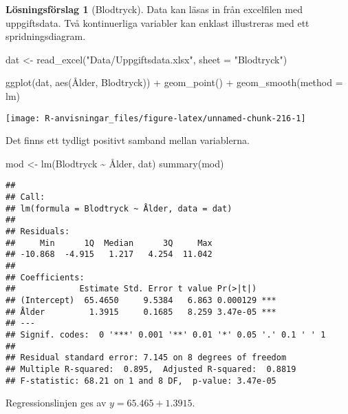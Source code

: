 \documentclass[
]{book}
\newenvironment{Shaded}{\begin{snugshade}}{\end{snugshade}}
\newcommand{\AttributeTok}[1]{\textcolor[rgb]{0.77,0.63,0.00}{#1}}
\newcommand{\FunctionTok}[1]{\textcolor[rgb]{0.00,0.00,0.00}{#1}}
\newcommand{\NormalTok}[1]{#1}
\newcommand{\OtherTok}[1]{\textcolor[rgb]{0.56,0.35,0.01}{#1}}
\newcommand{\SpecialCharTok}[1]{\textcolor[rgb]{0.00,0.00,0.00}{#1}}
\newcommand{\StringTok}[1]{\textcolor[rgb]{0.31,0.60,0.02}{#1}}
\theoremstyle{definition}
\theoremstyle{definition}
\theoremstyle{definition}
\theoremstyle{definition}
\newtheorem{hypothesis}{Lösningsförslag}[chapter]
\theoremstyle{remark}
\begin{document}
\begin{hypothesis}[Blodtryck]
Data kan läsas in från excelfilen med uppgiftsdata. Två kontinuerliga variabler kan enklast illustreras med ett spridningsdiagram.

\begin{Shaded}
\begin{Highlighting}[]
\NormalTok{dat }\OtherTok{\textless{}{-}} \FunctionTok{read\_excel}\NormalTok{(}\StringTok{"Data/Uppgiftsdata.xlsx"}\NormalTok{, }\AttributeTok{sheet =} \StringTok{"Blodtryck"}\NormalTok{)}

\FunctionTok{ggplot}\NormalTok{(dat, }\FunctionTok{aes}\NormalTok{(Ålder, Blodtryck)) }\SpecialCharTok{+}
  \FunctionTok{geom\_point}\NormalTok{() }\SpecialCharTok{+}
  \FunctionTok{geom\_smooth}\NormalTok{(}\AttributeTok{method =}\NormalTok{ lm)}
\end{Highlighting}
\end{Shaded}

\begin{center}\texttt{[image: R-anvisningar\_files/figure-latex/unnamed-chunk-216-1]} \end{center}

Det finns ett tydligt positivt samband mellan variablerna.

\begin{Shaded}
\begin{Highlighting}[]
\NormalTok{mod }\OtherTok{\textless{}{-}} \FunctionTok{lm}\NormalTok{(Blodtryck }\SpecialCharTok{\textasciitilde{}}\NormalTok{ Ålder, dat)}
\FunctionTok{summary}\NormalTok{(mod)}
\end{Highlighting}
\end{Shaded}

\begin{verbatim}
## 
## Call:
## lm(formula = Blodtryck ~ Ålder, data = dat)
## 
## Residuals:
##     Min      1Q  Median      3Q     Max 
## -10.868  -4.915   1.217   4.254  11.042 
## 
## Coefficients:
##             Estimate Std. Error t value Pr(>|t|)    
## (Intercept)  65.4650     9.5384   6.863 0.000129 ***
## Ålder         1.3915     0.1685   8.259 3.47e-05 ***
## ---
## Signif. codes:  0 '***' 0.001 '**' 0.01 '*' 0.05 '.' 0.1 ' ' 1
## 
## Residual standard error: 7.145 on 8 degrees of freedom
## Multiple R-squared:  0.895,  Adjusted R-squared:  0.8819 
## F-statistic: 68.21 on 1 and 8 DF,  p-value: 3.47e-05
\end{verbatim}

Regressionslinjen ges av \(y = 65.465 + 1.3915\).


\end{hypothesis}
\end{document}
